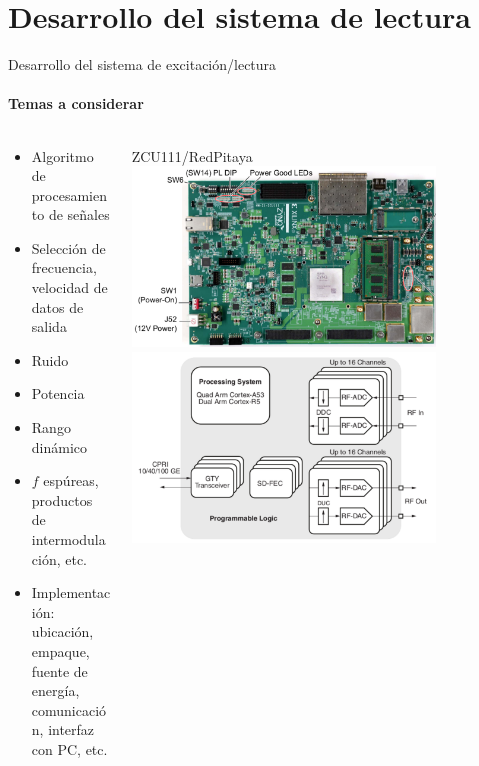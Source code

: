 \documentclass[ignorenonframetext,12pt]{beamer}
\begin{document}
		\section{Desarrollo del sistema de lectura}
		\begin{frame}{Desarrollo del sistema de excitación/lectura}
			\framesubtitle{Temas a considerar}
			\begin{columns}
				\begin{column}{0.5\textwidth}
					\normalsize{\begin{itemize}
						\item Algoritmo de procesamiento de señales
						\item Selección de frecuencia, velocidad de datos de salida
						\item Ruido
						\item Potencia
						\item Rango dinámico
						\item $f$ espúreas, productos de intermodulación, etc.
						\item Implementación: ubicación, empaque, fuente de
							energía, comunicación, interfaz con PC, etc.
					\end{itemize}}
				\end{column}
				\begin{column}{0.5\textwidth}
					ZCU111/RedPitaya
					\includegraphics[width=0.8\textwidth]{zcu2}
					\includegraphics[width=0.8\textwidth]{zcu1}

\end{column}
\end{columns}
\end{frame}
\end{document}
